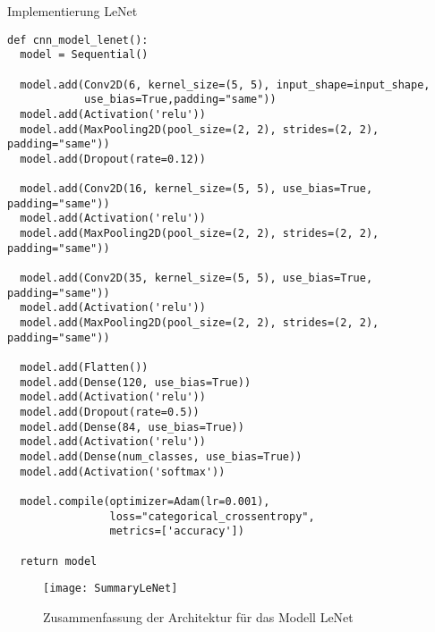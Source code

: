 \begin{listing} [H]
	\caption{Implementierung LeNet}
	\label{lst:lenet}
	\begin{verbatim}
def cnn_model_lenet():
  model = Sequential()

  model.add(Conv2D(6, kernel_size=(5, 5), input_shape=input_shape,
            use_bias=True,padding="same"))
  model.add(Activation('relu'))
  model.add(MaxPooling2D(pool_size=(2, 2), strides=(2, 2), padding="same"))
  model.add(Dropout(rate=0.12))

  model.add(Conv2D(16, kernel_size=(5, 5), use_bias=True, padding="same"))
  model.add(Activation('relu'))
  model.add(MaxPooling2D(pool_size=(2, 2), strides=(2, 2), padding="same"))

  model.add(Conv2D(35, kernel_size=(5, 5), use_bias=True, padding="same"))
  model.add(Activation('relu'))
  model.add(MaxPooling2D(pool_size=(2, 2), strides=(2, 2), padding="same"))

  model.add(Flatten())
  model.add(Dense(120, use_bias=True))
  model.add(Activation('relu'))
  model.add(Dropout(rate=0.5))
  model.add(Dense(84, use_bias=True))
  model.add(Activation('relu'))
  model.add(Dense(num_classes, use_bias=True))
  model.add(Activation('softmax'))

  model.compile(optimizer=Adam(lr=0.001),
                loss="categorical_crossentropy",
                metrics=['accuracy'])

  return model	
	\end{verbatim}
\end{listing} 

\begin{figure} [H]
	\centering
	\texttt{[image: SummaryLeNet]}
	\caption{Zusammenfassung der Architektur für das Modell LeNet}
	\label{pic:summary-lenet}
\end{figure}

